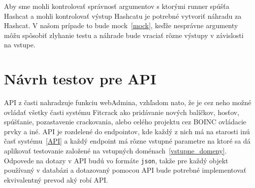 Aby sme mohli kontrolovať správnosť argumentov s ktorými runner spúšťa Hashcat a mohli kontrolovať výstup Hashcatu je potrebné vytvoriť náhradu za Hashcat.
V našom prípade to bude mock~\ref{mock}, keďže nesprávne argumenty môžu spôsobiť zlyhanie testu a náhrade bude vraciať rôzne výstupy v závislosti na vstupe.


\section{Návrh testov pre API}
API z časti nahradzuje funkciu webAdmina, vzhľadom nato, že je cez neho možné ovládať všetky časti systému Fitcrack ako pridávanie nových balíčkov, hosťov, spúšťanie, pozastavenie crackovania, alebo celého projektu cez BOINC ovládacie prvky a iné.
API je rozdelené do endpointov, kde každý z nich má na starosti inú časť systému~\ref{API} a každý endpoint má rôzne vstupné parametre na ktoré sa dá aplikovať testovanie založené na vstupných doménach~\ref{vstupne_domeny}.
Odpovede na dotazy v API budú vo formáte \texttt{json}, takže pre každý objekt používaný v databázi a dotazovaný pomocou API bude potrebné implementovať ekvivalentný prevod aký robí API.
